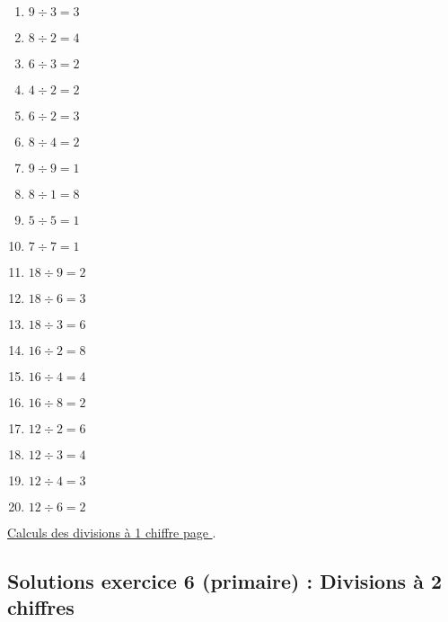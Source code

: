 \begin{enumerate}[label=C\arabic*)]
    \item \(9 \div 3 =  3\)
    \item \(8 \div 2 = 4\)
    \item \(6 \div 3 = 2\)
    \item \(4 \div 2 = 2\)
    \item \(6 \div 2 = 3\)
    \item \(8 \div 4 = 2\)
    \item \(9 \div 9 = 1\)
    \item \(8 \div 1 = 8\)
    \item \(5 \div 5 = 1\)
    \item \(7 \div 7 = 1\)
    \item \(18 \div 9 =  2\)
    \item \(18 \div 6 = 3\)
    \item \(18 \div 3 = 6\)
    \item \(16 \div 2 = 8\)
    \item \(16 \div 4 = 4\)
    \item \(16 \div 8 = 2\)
    \item \(12 \div 2 = 6\)
    \item \(12 \div 3 = 4\)
    \item \(12 \div 4 = 3\)
    \item \(12 \div 6 = 2\)
\end{enumerate}



\hyperref[calc:niveau5]{Calculs des divisions à 1 chiffre page \pageref{calc:niveau5}}.


\newpage 



\subsection{Solutions exercice 6 (primaire) : Divisions à 2 chiffres}

\label{sol:niveau6}


